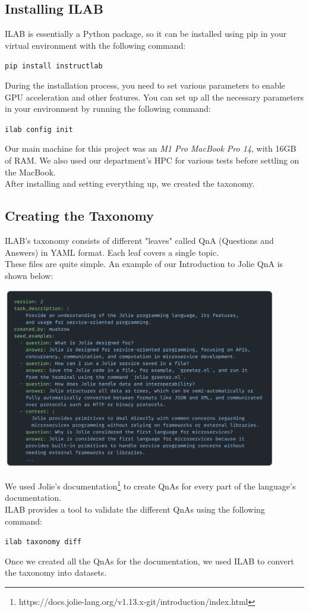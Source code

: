 \documentclass[12pt]{article}
\begin{document}
\subsection{Installing ILAB}
ILAB is essentially a Python package, so it can be installed using pip in your virtual environment with the following command:
\begin{center}
    \texttt{pip install instructlab}
\end{center}
During the installation process, you need to set various parameters to enable GPU acceleration and other features. You can set up all the necessary parameters in your environment by running the following command:
\begin{center}
    \texttt{ilab config init}
\end{center}
Our main machine for this project was an \textit{M1 Pro MacBook Pro 14}, with 16GB of RAM. We also used our department's HPC for various tests before settling on the MacBook.\vspace{14pt}\\
After installing and setting everything up, we created the taxonomy.

\subsection{Creating the Taxonomy}
ILAB's taxonomy consists of different "leaves" called QnA (Questions and Answers) in YAML format. Each leaf covers a single topic.\\
These files are quite simple. An example of our Introduction to Jolie QnA is shown below:
\begin{center}
    \includegraphics[width=0.9\textwidth]{img/qna.png}
\end{center}
We used Jolie's documentation\footnote{https://docs.jolie-lang.org/v1.13.x-git/introduction/index.html} to create QnAs for every part of the language's documentation.\\
ILAB provides a tool to validate the different QnAs using the following command:
\begin{center}
    \texttt{ilab taxonomy diff}
\end{center}
Once we created all the QnAs for the documentation, we used ILAB to convert the taxonomy into datasets.
\end{document}
